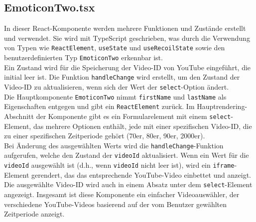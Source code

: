 \documentclass[./dokumentation.tex]{subfiles}
\begin{document}
\subsection{EmoticonTwo.tsx}
In dieser React-Komponente werden mehrere Funktionen und Zustände erstellt und verwendet. Sie wird mit TypeScript geschrieben, was durch die Verwendung von Typen wie \verb+ReactElement+, \verb+useState+ und \verb+useRecoilState+ sowie den benutzerdefinierten Typ \verb+EmoticonTwo+ erkennbar ist. \\
Ein Zustand wird für die Speicherung der Video-ID von YouTube eingeführt, die initial leer ist. Die Funktion \verb+handleChange+ wird erstellt, um den Zustand der Video-ID zu aktualisieren, wenn sich der Wert der \verb+select+-Option ändert.\\
Die Hauptkomponente \verb+EmoticonTwo+ nimmt \verb+firstName+ und \verb+lastName+ als Eigenschaften entgegen und gibt ein \verb+ReactElement+ zurück. Im Hauptrendering-Abschnitt der Komponente gibt es ein Formularelement mit einem \verb+select+-Element, das mehrere Optionen enthält, jede mit einer spezifischen Video-ID, die zu einer spezifischen Zeitperiode gehört (70er, 80er, 90er, 2000er). \\
Bei Änderung des ausgewählten Werts wird die \verb+handleChange+-Funktion aufgerufen, welche den Zustand der \verb+videoId+ aktualisiert. Wenn ein Wert für die \verb+videoId+ ausgewählt ist (d.h., wenn \verb+videoId+ nicht leer ist), wird ein \verb+iframe+-Element gerendert, das das entsprechende YouTube-Video einbettet und anzeigt. \\
Die ausgewählte Video-ID wird auch in einem Absatz unter dem \verb+select+-Element angezeigt. Insgesamt ist diese Komponente ein einfacher Videoauswähler, der verschiedene YouTube-Videos basierend auf der vom Benutzer gewählten Zeitperiode anzeigt.
\end{document}
